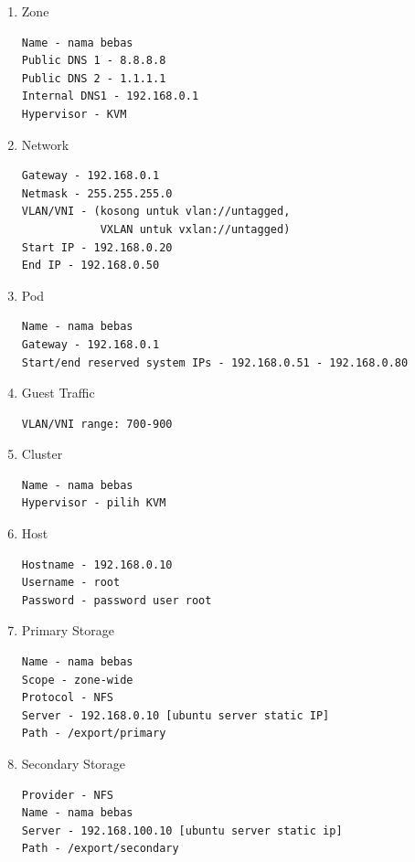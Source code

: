 \begin{enumerate}
    \item Zone
          \begin{verbatim}
Name - nama bebas
Public DNS 1 - 8.8.8.8
Public DNS 2 - 1.1.1.1
Internal DNS1 - 192.168.0.1
Hypervisor - KVM
    \end{verbatim}

    \item Network
          \begin{verbatim}
Gateway - 192.168.0.1
Netmask - 255.255.255.0
VLAN/VNI - (kosong untuk vlan://untagged, 
            VXLAN untuk vxlan://untagged)
Start IP - 192.168.0.20
End IP - 192.168.0.50
    \end{verbatim}

    \item Pod
          \begin{verbatim}
Name - nama bebas
Gateway - 192.168.0.1
Start/end reserved system IPs - 192.168.0.51 - 192.168.0.80
    \end{verbatim}

    \item Guest Traffic
          \begin{verbatim}
VLAN/VNI range: 700-900
    \end{verbatim}

    \item Cluster
          \begin{verbatim}
Name - nama bebas
Hypervisor - pilih KVM
    \end{verbatim}

    \item Host
          \begin{verbatim}
Hostname - 192.168.0.10
Username - root
Password - password user root
    \end{verbatim}

    \item Primary Storage
          \begin{verbatim}
Name - nama bebas
Scope - zone-wide
Protocol - NFS
Server - 192.168.0.10 [ubuntu server static IP]
Path - /export/primary
    \end{verbatim}

    \item Secondary Storage
          \begin{verbatim}
Provider - NFS
Name - nama bebas
Server - 192.168.100.10 [ubuntu server static ip]
Path - /export/secondary
    \end{verbatim}
\end{enumerate}

